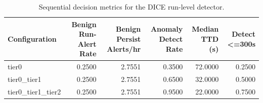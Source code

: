 \begin{table}[t]
\centering
\caption{Sequential decision metrics for the DICE run-level detector.}
\label{tab:dice_sequential_metrics}
\footnotesize
\begin{tabular}{lrrrrr}
\toprule
Configuration & Benign Run-Alert Rate & Benign Persist Alerts/hr & Anomaly Detect Rate & Median TTD (s) & Detect <=300s \\
\midrule
tier0 & 0.2500 & 2.7551 & 0.3500 & 72.0000 & 0.2500 \\
tier0_tier1 & 0.2500 & 2.7551 & 0.6500 & 32.0000 & 0.5000 \\
tier0_tier1_tier2 & 0.2500 & 2.7551 & 0.9500 & 22.0000 & 0.7500 \\
\bottomrule
\end{tabular}

\end{table}
